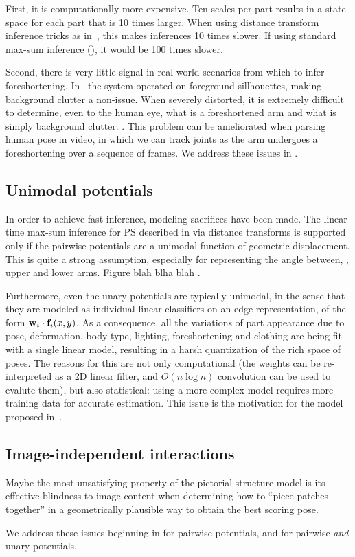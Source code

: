  First, it is computationally more expensive.  Ten scales per part results in a 
state space for each part that is 10 times larger.  When using distance 
transform inference tricks as in~, this makes inferences 10 times 
slower.  If using standard max-sum inference (), it 
would be 100 times slower.   

Second, there is very little signal in real world scenarios from which to infer 
foreshortening.  In~\citet{felz05} the system operated on foreground 
sillhouettes, making background clutter a non-issue.  When severely distorted, 
it is extremely difficult to determine, even to the human eye, what is a foreshortened arm and what is simply background clutter. .  This problem can be ameliorated when parsing human pose in video, in which we can track joints as the arm undergoes a foreshortening over a sequence of frames.  We address these issues in .

\subsection{Unimodal potentials}

In order to achieve fast inference, modeling sacrifices have been made.  The 
linear time max-sum inference for PS described in  via distance 
transforms is supported only if the pairwise potentials are a unimodal function 
of geometric displacement.  This is quite a strong assumption, especially for 
representing the angle between, \eg, upper and lower arms.  Figure blah blha 
blah . 

Furthermore, even the unary potentials are typically unimodal, in the sense 
that they are modeled as individual linear classifiers on an edge 
representation, of the form $\mathbf{w}_i \cdot \mathbf{f}_i(x,y)$.  As a consequence, all the 
variations of part appearance due to pose, deformation, body type, lighting, 
foreshortening and clothing are being fit with a single linear model, resulting 
in a harsh quantization of the rich space of poses.  The reasons for this are 
not only computational (the weights can be re-interpreted as a 2D linear 
filter, and $O(n \log n)$ convolution can be used to evalute them), but also 
statistical: using a more complex model requires more training data for 
accurate estimation.  This issue is the motivation for the model proposed 
in~.

\subsection{Image-independent interactions}  Maybe the most unsatisfying 
property of the pictorial structure model is its effective blindness to image 
content when determining how to ``piece patches together'' in a geometrically 
plausible way to obtain the best scoring pose.  


We address these issues beginning in  for pairwise potentials, and 
 for pairwise {\em and} unary potentials.





